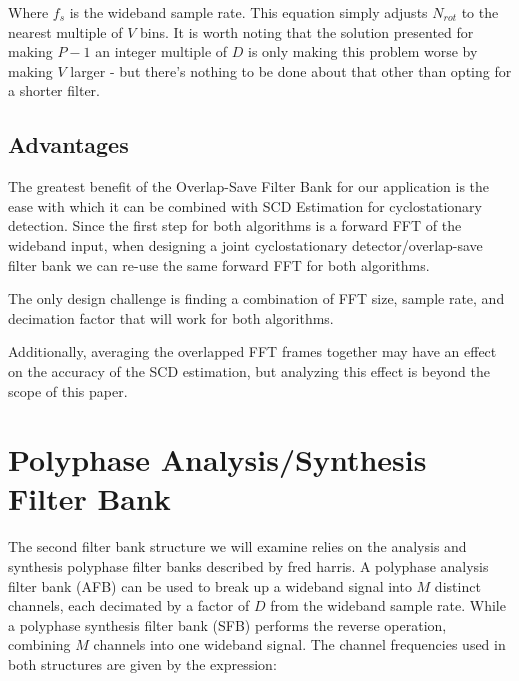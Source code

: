 \documentclass[12pt]{article}
\begin{document}
Where $f_s$ is the wideband sample rate. This equation simply adjusts $N_{rot}$
to the nearest multiple of $V$ bins. It is worth noting that the solution
presented for making $P-1$ an integer multiple of $D$ is only making this
problem worse by making $V$ larger - but there's nothing to be done about that
other than opting for a shorter filter.

\subsection{Advantages}
\label{sec:os_advantages}

The greatest benefit of the Overlap-Save Filter Bank for our application is the
ease with which it can be combined with SCD Estimation for cyclostationary
detection. Since the first step for both algorithms is a forward FFT of the
wideband input, when designing a joint cyclostationary detector/overlap-save
filter bank we can re-use the same forward FFT for both algorithms.


The only design challenge is finding a combination of FFT size, sample rate,
and decimation factor that will work for both algorithms.



Additionally, averaging the overlapped FFT frames together may have an effect
on the accuracy of the SCD estimation, but analyzing this effect is beyond the
scope of this paper.


\section{Polyphase Analysis/Synthesis Filter Bank}
\label{sec:poly_chan}
The second filter bank structure we will examine relies on the analysis and
synthesis polyphase filter banks described by fred harris\cite{Harris1}.
A polyphase analysis filter bank (AFB) can be used to break up a wideband signal into
$M$ distinct channels, each decimated by a factor of $D$ from the wideband
sample rate.  While a polyphase synthesis filter bank (SFB) performs the reverse
operation, combining $M$ channels into one wideband signal. The channel
frequencies used in both structures are given by the expression:
\end{document}
